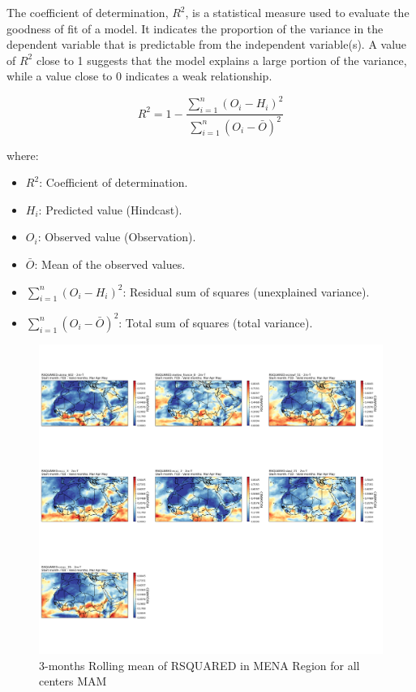 The coefficient of determination, \( R^2 \), is a statistical measure used to evaluate the goodness of fit of a model. It indicates the proportion of the variance in the dependent variable that is predictable from the independent variable(s). A value of \( R^2 \) close to 1 suggests that the model explains a large portion of the variance, while a value close to 0 indicates a weak relationship.

\[
R^2 = 1 - \frac{\sum_{i=1}^n (O_i - H_i)^2}{\sum_{i=1}^n (O_i - \bar{O})^2}
\]

where:

\begin{itemize}
	\item \( R^2 \): Coefficient of determination.
	\item \( H_i \): Predicted value (Hindcast).
	\item \( O_i \): Observed value (Observation).
	\item \( \bar{O} \): Mean of the observed values.
	\item \( \sum_{i=1}^n (O_i - H_i)^2 \): Residual sum of squares (unexplained variance).
	\item \( \sum_{i=1}^n (O_i - \bar{O})^2 \): Total sum of squares (total variance).
\end{itemize}

\begin{figure}[H]
\includegraphics[scale=0.3]{RSQUARED_MAM.png}
\caption{3-months Rolling mean of RSQUARED in MENA Region for all centers MAM}
\end{figure}

